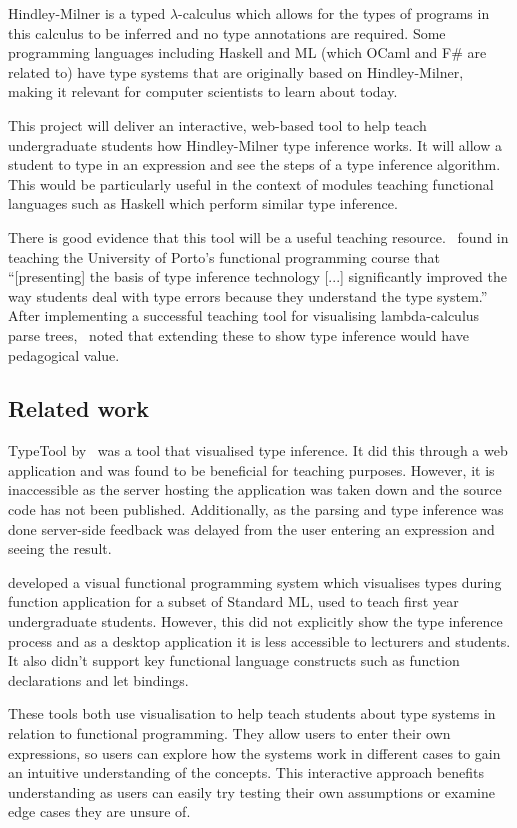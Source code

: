 \documentclass[a4paper,fleqn,12pt]{article}
\begin{document}
Hindley-Milner is a typed $\lambda$-calculus which allows for the types of programs in this calculus to be inferred and no type annotations are required. Some programming languages including Haskell and ML (which OCaml and F\# are related to) have type systems that are originally based on Hindley-Milner, making it relevant for computer scientists to learn about today.

This project will deliver an interactive, web-based tool to help teach undergraduate students how Hindley-Milner type inference works. It will allow a student to type in an expression and see the steps of a type inference algorithm. This would be particularly useful in the context of modules teaching functional languages such as Haskell which perform similar type inference.

There is good evidence that this tool will be a useful teaching resource.~\cite{ref2} found in teaching the University of Porto’s functional programming course that “[presenting] the basis of type inference technology [...] significantly improved the way students deal with type errors because they understand the type system.” After implementing a successful teaching tool for visualising lambda-calculus parse trees,~\cite{ref3} noted that extending these to show type inference would have pedagogical value.

\subsection{Related work}\label{id:h.2mwaav7jkal4}

TypeTool by~\cite{ref4} was a tool that visualised type inference. It did this through a web application and was found to be beneficial for teaching purposes. However, it is inaccessible as the server hosting the application was taken down and the source code has not been published. Additionally, as the parsing and type inference was done server-side feedback was delayed from the user entering an expression and seeing the result.

\cite{ref5} developed a visual functional programming system which visualises types during function application for a subset of Standard ML, used to teach first year undergraduate students. However, this did not explicitly show the type inference process and as a desktop application it is less accessible to lecturers and students. It also didn’t support key functional language constructs such as function declarations and let bindings.

These tools both use visualisation to help teach students about type systems in relation to functional programming. They allow users to enter their own expressions, so users can explore how the systems work in different cases to gain an intuitive understanding of the concepts. This interactive approach benefits understanding as users can easily try testing their own assumptions or examine edge cases they are unsure of.
\end{document}
